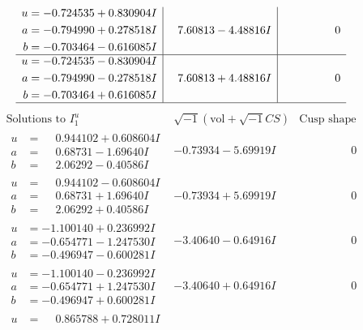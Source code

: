 \documentclass[1p]{elsarticle_modified}
\theoremstyle{definition}
\newcommand{\I}{\sqrt{-1}}
\begin{document}
$$\begin{array}{c|c|c}
\begin{aligned}
u &= -0.724535 + 0.830904 I \\
a &= -0.794990 + 0.278518 I \\
b &= -0.703464 - 0.616085 I\end{aligned}
 & \phantom{-}7.60813 - 4.48816 I & \phantom{-0.000000 } 0 \\ \hline\begin{aligned}
u &= -0.724535 - 0.830904 I \\
a &= -0.794990 - 0.278518 I \\
b &= -0.703464 + 0.616085 I\end{aligned}
 & \phantom{-}7.60813 + 4.48816 I & \phantom{-0.000000 } 0\\
 \hline 
 \end{array}$$\newpage$$\begin{array}{c|c|c}  
\text{Solutions to }I^u_{1}& \I (\text{vol} + \sqrt{-1}CS) & \text{Cusp shape}\\
 \hline 
\begin{aligned}
u &= \phantom{-}0.944102 + 0.608604 I \\
a &= \phantom{-}0.68731 - 1.69640 I \\
b &= \phantom{-}2.06292 - 0.40586 I\end{aligned}
 & -0.73934 - 5.69919 I & \phantom{-0.000000 } 0 \\ \hline\begin{aligned}
u &= \phantom{-}0.944102 - 0.608604 I \\
a &= \phantom{-}0.68731 + 1.69640 I \\
b &= \phantom{-}2.06292 + 0.40586 I\end{aligned}
 & -0.73934 + 5.69919 I & \phantom{-0.000000 } 0 \\ \hline\begin{aligned}
u &= -1.100140 + 0.236992 I \\
a &= -0.654771 - 1.247530 I \\
b &= -0.496947 - 0.600281 I\end{aligned}
 & -3.40640 - 0.64916 I & \phantom{-0.000000 } 0 \\ \hline\begin{aligned}
u &= -1.100140 - 0.236992 I \\
a &= -0.654771 + 1.247530 I \\
b &= -0.496947 + 0.600281 I\end{aligned}
 & -3.40640 + 0.64916 I & \phantom{-0.000000 } 0 \\ \hline\begin{aligned}
u &= \phantom{-}0.865788 + 0.728011 I \\

\end{aligned}
\end{array}$$
\end{document}
